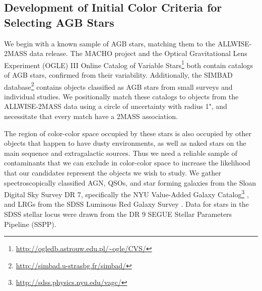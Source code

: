 \subsection{Development of Initial Color Criteria for Selecting AGB Stars}
We begin with a known sample of AGB stars, matching them to the ALLWISE-2MASS data release. The MACHO project \citep{2008AJ....136.1242F} and the Optical Gravitational Lens Experiment (OGLE) III Online Catalog of Variable Stars\footnote{\url{http://ogledb.astrouw.edu.pl/~ogle/CVS/}} both contain catalogs of AGB stars, confirmed from their variability. Additionally, the SIMBAD database\footnote{\url{http://simbad.u-strasbg.fr/simbad/}} contains objects classified as AGB stars from small surveys and individual studies. We positionally match these catalogs to objects from the ALLWISE-2MASS data using a circle of uncertainty with radius 1", and necessitate that every match have a 2MASS association.

The region of color-color space occupied by these stars is also occupied by other objects that happen to have dusty environments, as well as naked stars on the main sequence and extragalactic sources. Thus we need a reliable sample of contaminants that we can exclude in color-color space to increase the likelihood that our candidates represent the objects we wish to study. We gather spectroscopically classified AGN, QSOs, and star forming galaxies from the Sloan Digital Sky Survey \citep{2000AJ....120.1579Y} DR 7, specifically the NYU Value-Added Galaxy Catalog\footnote{\url{http://sdss.physics.nyu.edu/vagc/}} \citep[VAGC]{2005AJ....129.2562B}, and LRGs from the SDSS Luminous Red Galaxy Survey \citep{2010ApJ...710.1444K}. Data for stars in the SDSS stellar locus \citep{2014MNRAS.440.3430D} were drawn from the DR 9 SEGUE Stellar Parameters Pipeline (SSPP).

